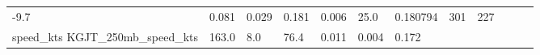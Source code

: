 \documentclass[11pt]{article}
\begin{document}
\begin{longtable}[]{@{}llllllllllll@{}}
\begin{minipage}[t]{0.04\columnwidth}
-9.7\strut
\end{minipage} & \begin{minipage}[t]{0.04\columnwidth}\raggedright\strut
0.081\strut
\end{minipage} & \begin{minipage}[t]{0.05\columnwidth}\raggedright\strut
0.029\strut
\end{minipage} & \begin{minipage}[t]{0.04\columnwidth}\raggedright\strut
0.181\strut
\end{minipage} & \begin{minipage}[t]{0.04\columnwidth}\raggedright\strut
0.006\strut
\end{minipage} & \begin{minipage}[t]{0.05\columnwidth}\raggedright\strut
25.0\strut
\end{minipage} & \begin{minipage}[t]{0.05\columnwidth}\raggedright\strut
0.180794\strut
\end{minipage} & \begin{minipage}[t]{0.05\columnwidth}\raggedright\strut
301\strut
\end{minipage} & \begin{minipage}[t]{0.07\columnwidth}\raggedright\strut
227\strut
\end{minipage}\tabularnewline
\begin{minipage}[t]{0.18\columnwidth}\raggedright\strut
speed\_kts KGJT\_250mb\_speed\_kts\strut
\end{minipage} & \begin{minipage}[t]{0.04\columnwidth}\raggedright\strut
163.0\strut
\end{minipage} & \begin{minipage}[t]{0.04\columnwidth}\raggedright\strut
8.0\strut
\end{minipage} & \begin{minipage}[t]{0.04\columnwidth}\raggedright\strut
76.4\strut
\end{minipage} & \begin{minipage}[t]{0.04\columnwidth}\raggedright\strut
0.011\strut
\end{minipage} & \begin{minipage}[t]{0.05\columnwidth}\raggedright\strut
0.004\strut
\end{minipage} & \begin{minipage}[t]{0.04\columnwidth}\raggedright\strut
0.172\strut
\end{minipage} & \begin{minipage}[t]{0.04\columnwidth}\raggedright\strut

\end{minipage}
\end{longtable}
\end{document}
